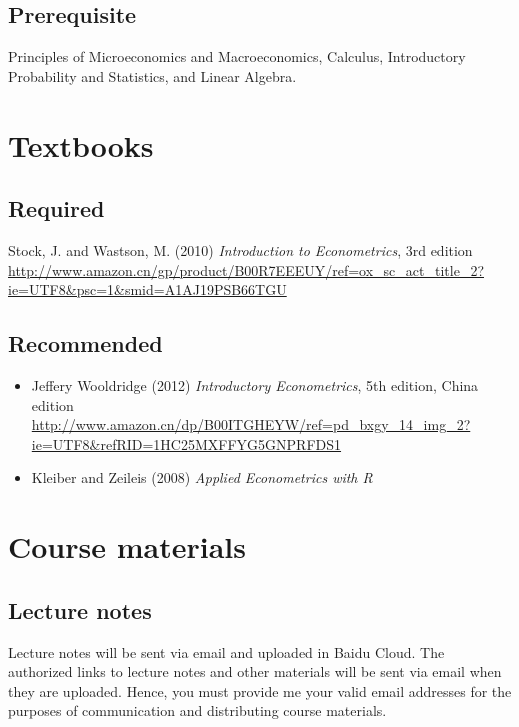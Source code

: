 \documentclass[a4paper,11pt]{article}
\begin{document}
\subsection*{Prerequisite}
\label{sec:orgf4a6c41}

Principles of Microeconomics and Macroeconomics, Calculus,
Introductory Probability and Statistics, and Linear Algebra.


\section{Textbooks}
\label{sec:orgd2f3166}
\subsection*{Required}
\label{sec:org0c107ce}

Stock, J. and Wastson, M. (2010) \emph{Introduction to Econometrics}, 3rd
edition
\href{http://www.amazon.cn/gp/product/B00R7EEEUY/ref\%3Dox\_sc\_act\_title\_2?ie\%3DUTF8\&psc\%3D1\&smid\%3DA1AJ19PSB66TGU}{\url{http://www.amazon.cn/gp/product/B00R7EEEUY/ref=ox\_sc\_act\_title\_2?ie=UTF8\&psc=1\&smid=A1AJ19PSB66TGU}}

\subsection*{Recommended}
\label{sec:org8df8d5e}

\begin{itemize}
\item Jeffery Wooldridge (2012) \emph{Introductory Econometrics}, 5th edition, China edition
\url{http://www.amazon.cn/dp/B00ITGHEYW/ref=pd\_bxgy\_14\_img\_2?ie=UTF8\&refRID=1HC25MXFFYG5GNPRFDS1}
\item Kleiber and Zeileis (2008) \emph{Applied Econometrics with R}
\end{itemize}


\section{Course materials}
\label{sec:org6805e6d}
\subsection*{Lecture notes}
\label{sec:orge17fdee}

Lecture notes will be sent via email and uploaded
in Baidu Cloud. The authorized links to lecture notes and other
materials will be sent via email when they are uploaded. Hence, you
must provide me your valid email addresses for the purposes of
communication and distributing course materials.
\end{document}
